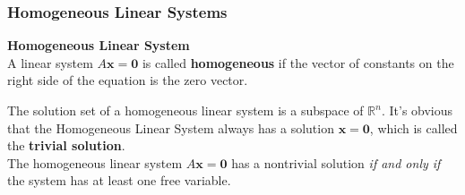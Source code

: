 \documentclass[10pt, a4paper]{article}
\begin{document}
\subsubsection*{Homogeneous Linear Systems}
\begin{definition}
    \textbf{Homogeneous Linear System}\\
    A linear system $A\mathbf{x}=\mathbf{0}$ is called \textbf{homogeneous} if the vector of constants on the right side of the equation is the zero vector.
\end{definition}
\indent The solution set of a homogeneous linear system is a subspace of $\mathbb{R}^n$. It's obvious that the Homogeneous Linear System always has a solution $\mathbf{x}=\mathbf{0}$, which is called the \textbf{trivial solution}.\\
\indent The homogeneous linear system $A\mathbf{x}=\mathbf{0}$ has a nontrivial solution \textit{if and only if} the system has at least one free variable.\\
\end{document}
